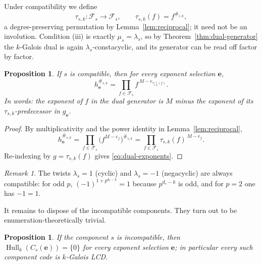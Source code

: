 \documentclass[11pt,a4paper]{article}
\newcommand{\Fs}{\mathcal F_s}
\newcommand{\Hull}{\operatorname{Hull}}
\numberwithin{equation}{section}
\theoremstyle{plain}
\newtheorem{proposition}[theorem]{Proposition}
\theoremstyle{definition}
\theoremstyle{remark}
\newtheorem{remark}[theorem]{Remark}
\begin{document}
Under compatibility we define
\[
\tau_{s,k}:\Fs\longrightarrow\Fs,\qquad \tau_{s,k}(f)=f^{\#_{s,k}},
\]
a degree-preserving permutation by Lemma~\ref{lem:reciprocal}; it need not be
an involution.  Condition (iii) is exactly $\mu_s=\lambda_s$, so by
Theorem~\ref{thm:dual-generator} the $k$-Galois dual is again
$\lambda_s$-constacyclic, and its generator can be read off factor by factor.

\begin{proposition}\label{prop:dual-exponents}
If $s$ is compatible, then for every exponent selection $\mathbf{e}$,
\begin{equation}\label{eq:dual-exponents}
h_{\mathbf{e}}^{\#_{s,k}}
   =\prod_{f\in\Fs} f^{\,M-e_{\tau_{s,k}^{-1}(f)}}.
\end{equation}
In words: the exponent of $f$ in the dual generator is $M$ minus the exponent
of its $\tau_{s,k}$-predecessor in $g_{\mathbf{e}}$.
\end{proposition}

\begin{proof}
By multiplicativity and the power identity in Lemma~\ref{lem:reciprocal},
\[
h_{\mathbf{e}}^{\#_{s,k}}
 =\prod_{f\in\Fs}\bigl(f^{M-e_f}\bigr)^{\#_{s,k}}
 =\prod_{f\in\Fs}\tau_{s,k}(f)^{\,M-e_f}.
\]
Re-indexing by $g=\tau_{s,k}(f)$ gives \eqref{eq:dual-exponents}.
\end{proof}

\begin{remark}\label{rem:special-twists}
The twists $\lambda_s=1$ (cyclic) and $\lambda_s=-1$ (negacyclic) are always
compatible: for odd $p$, $(-1)^{1+p^{d_s-k}}=1$ because $p^{d_s-k}$ is odd, and
for $p=2$ one has $-1=1$.
\end{remark}

It remains to dispose of the incompatible components.  They turn out to be
enumeration-theoretically trivial.

\begin{proposition}\label{prop:incompatible}
If the component $s$ is incompatible, then
$\Hull_k(C_s(\mathbf{e}))=\{0\}$ for every exponent selection $\mathbf{e}$; in
particular every such component code is $k$-Galois LCD.
\end{proposition}
\end{document}
